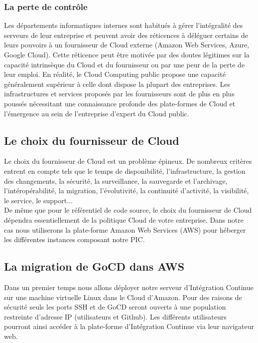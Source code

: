         \subsubsection{La perte de contrôle}
        Les départements informatiques internes sont habitués à gérer l'intégralité des serveurs de leur entreprise et peuvent avoir des réticences à déléguer certains de leurs pouvoirs à un fournisseur de Cloud externe (Amazon Web Services, Azure, Google Cloud). Cette réticence peut être motivée par des doutes légitimes sur la capacité intrinsèque du Cloud et du fournisseur ou par une peur de la perte de leur emploi. En réalité, le Cloud Computing public propose une capacité généralement supérieur à celle dont dispose la plupart des entreprises. Les infrastructures et services proposés par les fournisseurs sont de plus en plus poussés nécessitant une connaissance profonde des plate-formes de Cloud et l'émergence au sein de l'entreprise d'expert du Cloud public.

      \subsection{Le choix du fournisseur de Cloud}
      Le choix du fournisseur de Cloud est un problème épineux. De nombreux critères entrent en compte tels que le temps de disponibilité, l'infrastructure, la gestion des changements, la sécurité, la surveillance, la sauvegarde et l'archivage, l'intéropérabilité, la migration, l'évolutivité, la continuité d'activité, la visibilité, le service, le support...\\

      De même que pour le référentiel de code source, le choix du fournisseur de Cloud dépendra essentiellement de la politique Cloud de votre entreprise. Dans notre cas nous utiliserons la plate-forme Amazon Web Services (AWS) pour héberger les différentes instances composant notre PIC.

      \subsection{La migration de GoCD dans AWS}
      Dans un premier temps nous allons déployer notre serveur d'Intégration Continue sur une machine virtuelle Linux dans le Cloud d'Amazon. Pour des raisons de sécurité seuls les ports SSH et de GoCD seront ouverts à une population restreinte d'adresse IP (utilisateurs et Github). Les différents utilisateurs pourront ainsi accéder à la plate-forme d'Intégration Continue via leur navigateur web.\\

